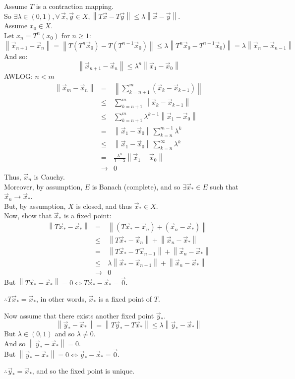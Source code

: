 \documentclass[letterpaper,12pt,fleqn]{article}
\renewcommand{\l}{\lambda}
\newcommand{\vx}{\vec{x}}
\newcommand{\vy}{\vec{y}}
\newcommand{\vo}{\vec{0}}
\newcommand{\norm}[1]{\left\|#1\right\|}
\begin{document}
\begin{theproof}
  Assume $T$ is a contraction mapping. \\
  So $\exists\l\in(0,1),\forall\,\vx,\vy\in X,\norm{T\vx-T\vy}\le
  \l\norm{\vx-\vy}$. \\
  Assume $x_0\in X$. \\
  Let $x_n=T^n(x_0)$ for $n\ge1$: \\
  \[\norm{\vx_{n+1}-\vx_n}=\norm{T(T^n\vx_0)-T(T^{n-1}\vx_0)}\le
  \l\norm{T^n\vx_0-T^{n-1}\vx_0)}=\l\norm{\vx_n-\vx_{n-1}}\]
  And so:
  \[\norm{\vx_{n+1}-\vx_n}\le\l^n\norm{\vx_1-\vx_0}\]
  AWLOG: $n<m$
  \begin{eqnarray*}
    \norm{\vx_m-\vx_n} &=& \norm{\sum_{k=n+1}^m(\vx_k-\vx_{k-1})} \\
    &\le& \sum_{k=n+1}^m\norm{\vx_k-\vx_{k-1}} \\
    &\le& \sum_{k=n+1}^m\l^{k-1}\norm{\vx_1-\vx_0} \\
    &=& \norm{\vx_1-\vx_0}\sum_{k=n}^{m-1}\l^k \\
    &\le& \norm{\vx_1-\vx_0}\sum_{k=n}^{\infty}\l^k \\
    &=& \frac{\l^n}{1-\l}\norm{\vx_1-\vx_0} \\
    &\to& 0
  \end{eqnarray*}
  Thus, $\vx_n$ is Cauchy. \\
  Moreover, by assumption, $E$ is Banach (complete), and so $\exists\vx_*\in E$
  such that $\vx_n\to\vx_*$. \\
  But, by assumption, $X$ is closed, and thus $\vx_*\in X$. \\

  Now, show that $\vx_*$ is a fixed point:
  \begin{eqnarray*}
    \norm{T\vx_*-\vx_*} &=& \norm{(T\vx_*-\vx_n)+(\vx_n-\vx_*)} \\
    &\le& \norm{T\vx_*-\vx_n}+\norm{\vx_n-\vx_*} \\
    &=& \norm{T\vx_*-T\vx_{n-1}}+\norm{\vx_n-\vx_*} \\
    &\le& \l\norm{\vx_*-\vx_{n-1}}+\norm{\vx_n-\vx_*} \\
    &\to& 0
  \end{eqnarray*}
  But $\norm{T\vx_*-\vx_*}=0\iff T\vx_*-\vx_*=\vo$.
  
  $\therefore T\vx_*=\vx_*$, in other words, $\vx_*$ is a fixed point of $T$.

  Now assume that there exists another fixed point $\vy_*$. \\
  \[\norm{\vy_*-\vx_*}=\norm{T\vy_*-T\vx_*}\le\l\norm{\vy_*-\vx_*}\]
  But $\l\in(0,1)$ and so $\l\ne0$. \\
  And so $\norm{\vy_*-\vx_*}=0$. \\
  But $\norm{\vy_*-\vx_*}=0\iff\vy_*-\vx_*=\vo$.

  $\therefore\vy_*=\vx_*$, and so the fixed point is unique.
\end{theproof}
\end{document}

